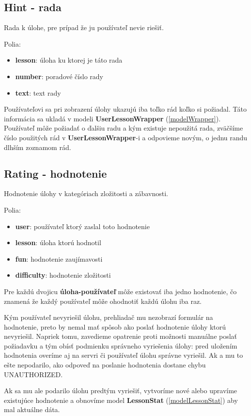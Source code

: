 \subsection{Hint - rada}
Rada k úlohe, pre prípad že ju používateľ nevie riešiť.

Polia:
\begin{itemize}
\item \textbf{lesson}: úloha ku ktorej je táto rada
\item \textbf{number}: poradové číslo rady
\item \textbf{text}: text rady
\end{itemize}

Používateľovi sa pri zobrazení úlohy ukazujú iba toľko rád koľko si požiadal. Táto
informácia sa ukladá v modeli \textbf{UserLessonWrapper} (\ref{modelWrapper}).
Používateľ môže požiadať o ďalšiu radu a kým existuje nepoužitá rada, zväčšíme
číslo použitých rád v \textbf{UserLessonWrapper}-i a odpovieme novým, o jednu randu dlhším zoznamom rád.

\subsection{Rating - hodnotenie}
Hodnotenie úlohy v kategóriach zložitosti a zábavnosti.

Polia:
\begin{itemize}
\item \textbf{user}: používateľ ktorý zaslal toto hodnotenie
\item \textbf{lesson}: úloha ktorú hodnotil
\item \textbf{fun}: hodnotenie zaujímavosti
\item \textbf{difficulty}: hodnotenie zložitosti
\end{itemize}

Pre každú dvojicu \textbf{úloha-používateľ} môže existovať iba jedno hodnotenie,
čo znamená že každý používateľ môže ohodnotiť každú úlohu iba raz.

Kým používateľ nevyriešil úlohu, prehliadač mu nezobrazí formulár na hodnotenie,
preto by nemal mať spôsob ako poslať hodnotenie úlohy ktorú nevyriešil.
Napriek tomu, zavedieme opatrenie proti
možnosti manuálne poslať požiadavku a tým obísť podmienku správneho vyriešenia úlohy:
pred uložením hodnotenia overíme aj na servri či používateľ úlohu správne vyriešil.
Ak a mu to ešte nepodarilo, ako odpoveď na poslanie hodnotenia dostane chybu UNAUTHORIZED.

 Ak sa mu ale podarilo úlohu predtým
vyriešiť, vytvoríme nové alebo upravíme existujúce hodnotenie a obnovíme model \textbf{LessonStat} (\ref{modelLessonStat})
aby mal aktuálne dáta.

